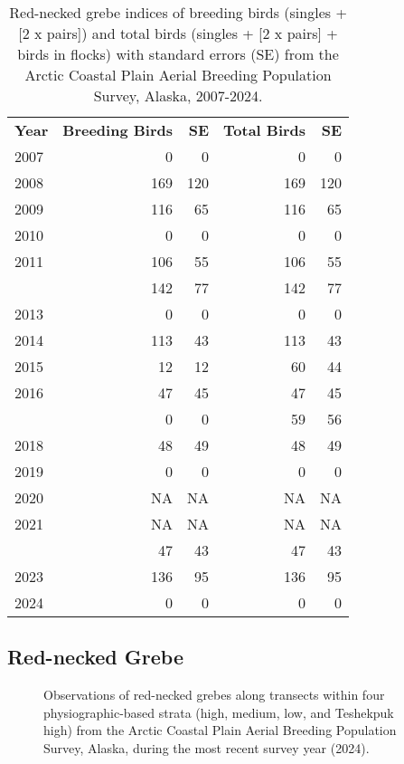 \documentclass[
]{article}
\begin{document}
\begingroup\fontsize{10}{12}\selectfont

\begin{longtable}[t]{lrrrr}

\caption{\label{tbl-RNGR}Red-necked grebe indices of breeding birds
(singles + {[}2 x pairs{]}) and total birds (singles + {[}2 x pairs{]} +
birds in flocks) with standard errors (SE) from the Arctic Coastal Plain
Aerial Breeding Population Survey, Alaska, 2007-2024.}

\tabularnewline

\\
\toprule
\textbf{Year} & \textbf{Breeding Birds} & \textbf{SE} & \textbf{Total Birds} & \textbf{SE}\\
\midrule
2007 & 0 & 0 & 0 & 0\\
2008 & 169 & 120 & 169 & 120\\
2009 & 116 & 65 & 116 & 65\\
2010 & 0 & 0 & 0 & 0\\
2011 & 106 & 55 & 106 & 55\\
\addlinespace
2012 & 142 & 77 & 142 & 77\\
2013 & 0 & 0 & 0 & 0\\
2014 & 113 & 43 & 113 & 43\\
2015 & 12 & 12 & 60 & 44\\
2016 & 47 & 45 & 47 & 45\\
\addlinespace
2017 & 0 & 0 & 59 & 56\\
2018 & 48 & 49 & 48 & 49\\
2019 & 0 & 0 & 0 & 0\\
2020 & NA & NA & NA & NA\\
2021 & NA & NA & NA & NA\\
\addlinespace
2022 & 47 & 43 & 47 & 43\\
2023 & 136 & 95 & 136 & 95\\
2024 & 0 & 0 & 0 & 0\\
\bottomrule

\end{longtable}

\endgroup{}

\newpage{}

\subsection*{Red-necked Grebe}\label{red-necked-grebe-2}

\begin{figure}


\caption{\label{fig-RNGRmap}Observations of red-necked grebes along
transects within four physiographic-based strata (high, medium, low, and
Teshekpuk high) from the Arctic Coastal Plain Aerial Breeding Population
Survey, Alaska, during the most recent survey year (2024).}

\end{figure}%
\end{document}
